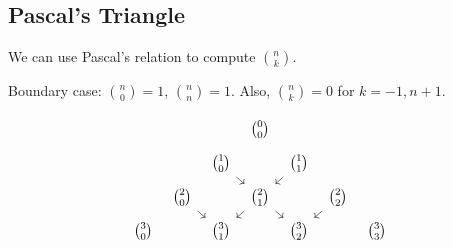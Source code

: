 \subsection{Pascal's Triangle}
We can use Pascal's relation to compute \(\binom{n}{k}\). 
\begin{note}
  Boundary case: \(\binom{n}{0} = 1\), \(\binom{n}{n} = 1\). Also, \(\binom{n}{k} = 0\) for \(k=-1,n+1\).    
\end{note} 
\[\begin{tikzcd}[sep=tiny]
	&&& {\binom{0}{0}} \\
	&& {\binom{1}{0}} && {\binom{1}{1}} \\
	& {\binom{2}{0}} && {\binom{2}{1}} && {\binom{2}{2}} \\
	{\binom{3}{0}} && {\binom{3}{1}} && {\binom{3}{2}} && {\binom{3}{3}}
	\arrow[from=2-3, to=3-4]
	\arrow[from=2-5, to=3-4]
	\arrow[from=3-2, to=4-3]
	\arrow[from=3-4, to=4-3]
	\arrow[from=3-4, to=4-5]
	\arrow[from=3-6, to=4-5]
\end{tikzcd}\]

